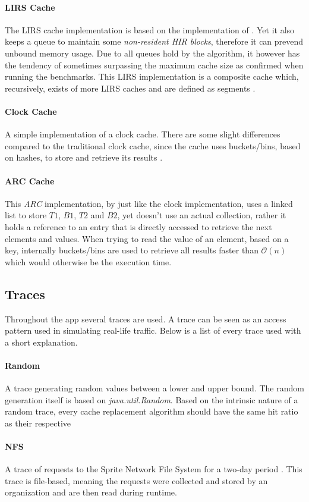 \documentclass[pdftex,a4paper,12pt,twoside]{report}
\begin{document}
\paragraph{LIRS Cache} The LIRS cache implementation is based on the implementation of \cite{jiang2002lirs}. Yet it also keeps a queue to maintain some \emph{non-resident HIR blocks}, therefore it can prevend unbound memory usage. Due to all queues hold by the algorithm, it however has the tendency of sometimes surpassing the maximum cache size as confirmed when running the benchmarks. This LIRS implementation is a composite cache which, recursively, exists of more LIRS caches and are defined as segments \citep{cachelirs_oak}.
\paragraph{Clock Cache} A simple implementation of a clock cache. There are some slight differences compared to the traditional clock cache, since the cache uses buckets/bins, based on hashes, to store and retrieve its results \citep{cache2k_clock}.
\paragraph{ARC Cache} This \emph{ARC} implementation, by \cite{cache2k_arc} just like the clock implementation, uses a linked list to store $T1$, $B1$, $T2$ and $B2$, yet doesn't use an actual collection, rather it holds a reference to an entry that is directly accessed to retrieve the next elements and values. When trying to read the value of an element, based on a key, internally buckets/bins are used to retrieve all results faster than $\mathcal{O}(n)$ which would otherwise be the execution time.
\subsection{Traces}
\label{sec:traces}
Throughout the app several traces are used. A trace can be seen as an access pattern used in simulating real-life traffic. Below is a list of every trace used with a short explanation.
\paragraph{Random} A trace generating random values between a lower and upper bound. The random generation itself is based on \emph{java.util.Random}. Based on the intrinsic nature of a random trace, every cache replacement algorithm should have the same hit ratio as their respective 
\paragraph{NFS} A trace of requests to the Sprite Network File System for a two-day period \citep{jiang2005clock}. This trace is file-based, meaning the requests were collected and stored by an organization and are then read during runtime.
\end{document}
